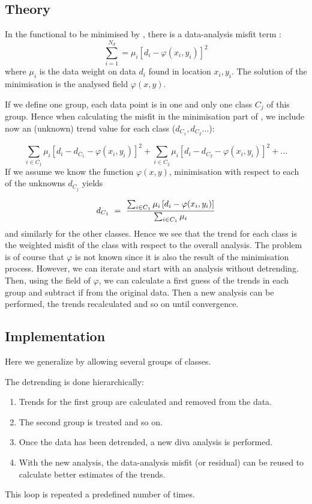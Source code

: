\subsection{Theory}

In the functional to be minimised by \diva, there is a data-analysis misfit term :
\begin{equation}
\sum_{i=1}^{N_{d}} =  \mu_i \left[ d_i - \varphi(x_i,y_i) \right]^2
\end{equation}
where $\mu_i$ is the data weight on data $d_i$ found in location $x_i,y_i$. The solution of the minimisation is the analysed field $\varphi(x,y)$.


If we define one group, each data point is in one and only one class $C_j$ of this group. Hence
when calculating the misfit in the minimisation part of \diva, we include now an (unknown) trend value for each class ($d_{C_1}, d_{C_2} \ldots$):

\begin{equation}
\sum_{i\in C_1} \mu_i \left[ d_i -d_{C_1}- \varphi(x_i,y_i) \right]^2 + \sum_{i\in C_2} \mu_i \left[ d_i -d_{C_2}- \varphi(x_i,y_i) \right]^2 + ...
\end{equation}
If we assume we know the function $\varphi(x,y)$, minimisation with respect to each of the unknowns $d_{C_j}$ yields


\begin{equation}
d_{C_1} ~=~{ \sum_{i\in C_1} \mu_i \left[ d_i - \varphi(x_i,y_i) \right] \over \sum_{i\in C_1} \mu_i }
\end{equation}
and similarly for the other classes. Hence we see that the trend for each class is the weighted misfit of the class with respect to the overall analysis.
The problem is of course that $\varphi$ is not known since it is also the result of the minimisation process. However, we can iterate and start with an analysis without detrending. Then, using the field of $\varphi$, we can calculate a first guess of the trends in each group and subtract if from the original data. 
Then a new analysis can be performed, the trends recalculated and so on until convergence.


\subsection{Implementation}

Here we generalize by allowing several groups of classes.

The detrending is done hierarchically:
\begin{enumerate}
\item Trends for the first group are calculated and removed from the data. 
\item The second group is treated and so on.
\item Once the data has been detrended, a new diva analysis is performed. 
\item With the new analysis, the data-analysis misfit (or residual) can be reused to
calculate better estimates of the trends. 
\end{enumerate}
This loop is repeated a predefined number of times. 

